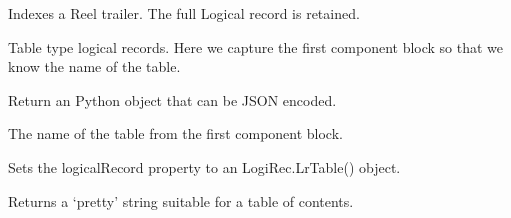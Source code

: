 \documentclass[letterpaper,10pt,english]{sphinxmanual}
\begin{document}
\begin{fulllineitems}
\label{\detokenize{ref/LIS/core/FileIndexer:TotalDepth.LIS.core.FileIndexer.IndexReelTail}}
Indexes a Reel trailer. The full Logical record is retained.

\end{fulllineitems}


\begin{fulllineitems}
\label{\detokenize{ref/LIS/core/FileIndexer:TotalDepth.LIS.core.FileIndexer.IndexTable}}
Table type logical records. Here we capture the first component block so
that we know the name of the table.

\begin{fulllineitems}
\label{\detokenize{ref/LIS/core/FileIndexer:TotalDepth.LIS.core.FileIndexer.IndexTable.jsonObject}}
Return an Python object that can be JSON encoded.

\end{fulllineitems}


\begin{fulllineitems}
\label{\detokenize{ref/LIS/core/FileIndexer:TotalDepth.LIS.core.FileIndexer.IndexTable.name}}
The name of the table from the first component block.

\end{fulllineitems}


\begin{fulllineitems}
\label{\detokenize{ref/LIS/core/FileIndexer:TotalDepth.LIS.core.FileIndexer.IndexTable.setLogicalRecord}}
Sets the logicalRecord property to an LogiRec.LrTable() object.

\end{fulllineitems}


\begin{fulllineitems}
\label{\detokenize{ref/LIS/core/FileIndexer:TotalDepth.LIS.core.FileIndexer.IndexTable.tocStr}}
Returns a ‘pretty’ string suitable for a table of contents.

\end{fulllineitems}


\end{fulllineitems}
\end{document}

